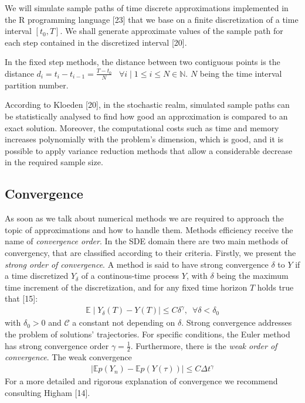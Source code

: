 \documentclass[12pt,twoside]{reedthesis}
\theoremstyle{definition}
\theoremstyle{definition}
\theoremstyle{remark}
\begin{document}
  We will simulate sample paths of time discrete approximations
  implemented in the R programming language {[}23{]} that we base on a
  finite discretization of a time interval \([t_0, T]\). We shall generate
  approximate values of the sample path for each step contained in the
  discretized interval {[}20{]}.
  
  In the fixed step methods, the distance between two contiguous points is
  the distance
  \(d_i = t_i - t_{i-1} = \frac{T-t_0}{N} \;\;\; \forall i \mid 1 \leq i \leq N \in \mathbb{N}\).
  \(N\) being the time interval partition number.
  
  According to Kloeden {[}20{]}, in the stochastic realm, simulated sample
  paths can be statistically analysed to find how good an approximation is
  compared to an exact solution. Moreover, the computational costs such as
  time and memory increases polynomially with the problem's dimension,
  which is good, and it is possible to apply variance reduction methods
  that allow a considerable decrease in the required sample size.
  
  \subsection{Convergence}\label{convergence}
  
  As soon as we talk about numerical methods we are required to approach
  the topic of approximations and how to handle them. Methods efficiency
  receive the name of \emph{convergence order}. In the SDE domain there
  are two main methods of convergency, that are classified according to
  their criteria. Firstly, we present the \emph{strong order of
  convergence}. A method is said to have strong convergence \(\delta\) to
  \(Y\) if a time discretized \(Y_{\delta}\) of a continous-time process
  \(Y\), with \(\delta\) being the maximum time increment of the
  discretization, and for any fixed time horizon \(T\) holds true that
  {[}15{]}:
  \begin{align*}
  \mathbb{E} \mid Y_{\delta}(T) - Y(T) \mid \leq C \delta^{\gamma}, \,\,\, \forall \delta < \delta_0
  \end{align*}
  with \(\delta_0 > 0\) and \(\mathcal{C}\) a constant not depending on
  \(\delta\). Strong convergence addresses the problem of solutions'
  trajectories. For specific conditions, the Euler method has strong
  convergence order \(\gamma = \frac{1}{2}\). Furthermore, there is the
  \emph{weak order of convergence}. The weak convergence
  \begin{align*}
  \mid  \mathbb{E}p(Y_n) - \mathbb{E}p(Y(\tau)) \mid \leq C \Delta t^{\gamma}
  \end{align*}
  For a more detailed and rigorous explanation of convergence we recommend
  consulting Higham {[}14{]}.
  
\end{document}
